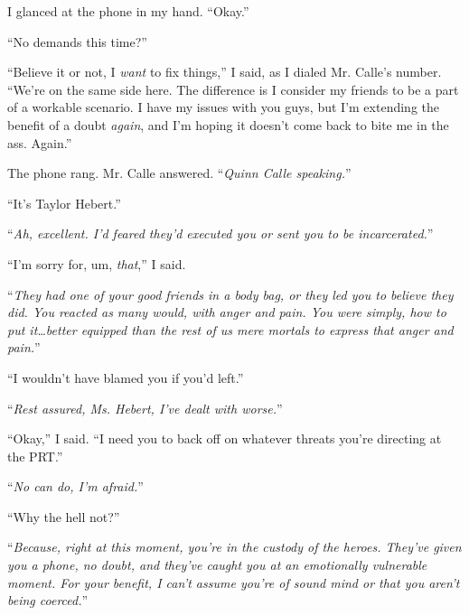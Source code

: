 I glanced at the phone in my hand.  ``Okay.''



``No demands this time?''



``Believe it or not, I \emph{want }to fix things,'' I said, as I dialed Mr. Calle's number.  ``We're on the same side here.  The difference is I consider my friends to be a part of a workable scenario.  I have my issues with you guys, but I'm extending the benefit of a doubt \emph{again}, and I'm hoping it doesn't come back to bite me in the ass.  Again.''



The phone rang.  Mr. Calle answered.  ``\emph{Quinn Calle speaking.}''



``It's Taylor Hebert.''



``\emph{Ah, excellent.  I'd feared they'd executed you or sent you to be incarcerated.}''



``I'm sorry for, um, \emph{that},'' I said.



``\emph{They had one of your good friends in a body bag, or they led you to believe they did.  You reacted as many would, with anger and pain.  You were simply, how to put it\ldots better equipped than the rest of us mere mortals to express that anger and pain.}''



``I wouldn't have blamed you if you'd left.''



``\emph{Rest assured, Ms. Hebert, I've dealt with worse.}''



``Okay,'' I said.  ``I need you to back off on whatever threats you're directing at the PRT.''



``\emph{No can do, I'm afraid.}''



``Why the hell not?''



``\emph{Because, right at this moment, you're in the custody of the heroes.  They've given you a phone, no doubt, and they've caught you at an emotionally vulnerable moment.  For your benefit, I can't assume you're of sound mind or that you aren't being coerced.}''



